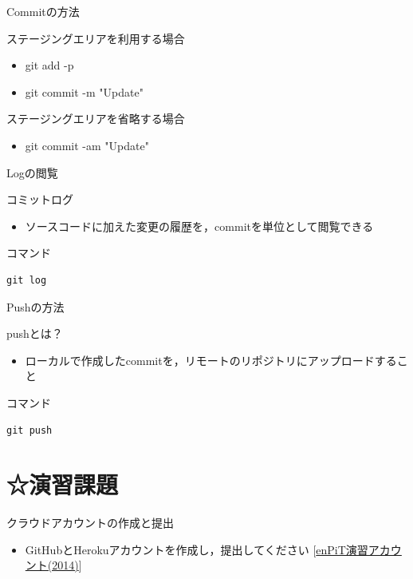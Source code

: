 \documentclass[12pt, t, aspectratio=169]{beamer}
\begin{document}
\begin{frame}[label=sec-2-4-4]{Commitの方法}
\begin{block}{ステージングエリアを利用する場合}
\begin{itemize}
\item git add -p
\item git commit -m "Update"
\end{itemize}
\end{block}
\begin{block}{ステージングエリアを省略する場合}
\begin{itemize}
\item git commit -am "Update"
\end{itemize}
\end{block}
\end{frame}
\begin{frame}[fragile,label=sec-2-4-5]{Logの閲覧}
 \begin{block}{コミットログ}
\begin{itemize}
\item ソースコードに加えた変更の履歴を，commitを単位として閲覧できる
\end{itemize}
\end{block}
\begin{block}{コマンド}
\begin{verbatim}
git log
\end{verbatim}
\end{block}
\end{frame}

\begin{frame}[fragile,label=sec-2-4-6]{Pushの方法}
 \begin{block}{pushとは？}
\begin{itemize}
\item ローカルで作成したcommitを，リモートのリポジトリにアップロードすること
\end{itemize}
\end{block}
\begin{block}{コマンド}
\begin{verbatim}
git push
\end{verbatim}
\end{block}
\end{frame}

\section{☆演習課題}
\label{sec-2-5}
\begin{frame}[label=sec-2-5-1]{クラウドアカウントの作成と提出}
\begin{itemize}
\item GitHubとHerokuアカウントを作成し，提出してください
[\href{https://docs.google.com/forms/d/1SiKQqDLQw2YiJieYVS79ywpHIaNC3uI9cNPb_ddhC1Q/viewform?usp=send_form}{enPiT演習アカウント(2014)}]
\end{itemize}
\end{frame}
\end{document}
